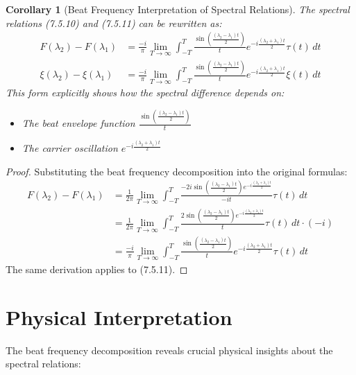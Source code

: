 \documentclass[12pt]{article}
\newtheorem{corollary}{Corollary}
\begin{document}
\begin{corollary}[Beat Frequency Interpretation of Spectral Relations]
The spectral relations (7.5.10) and (7.5.11) can be rewritten as:
\begin{align}
F(\lambda_2) - F(\lambda_1) &= \frac{-i}{\pi} \lim_{T \to \infty} \int_{-T}^{T} \frac{\sin\left(\frac{(\lambda_2 - \lambda_1)t}{2}\right)}{t} e^{-i\frac{(\lambda_2 + \lambda_1)t}{2}} \tau(t) \, dt\\
\xi(\lambda_2) - \xi(\lambda_1) &= \frac{-i}{\pi} \lim_{T \to \infty} \int_{-T}^{T} \frac{\sin\left(\frac{(\lambda_2 - \lambda_1)t}{2}\right)}{t} e^{-i\frac{(\lambda_2 + \lambda_1)t}{2}} \xi(t) \, dt
\end{align}
This form explicitly shows how the spectral difference depends on:
\begin{itemize}
\item The beat envelope function $\frac{\sin\left(\frac{(\lambda_2 - \lambda_1)t}{2}\right)}{t}$
\item The carrier oscillation $e^{-i\frac{(\lambda_2 + \lambda_1)t}{2}}$
\end{itemize}
\end{corollary}

\begin{proof}
Substituting the beat frequency decomposition into the original formulas:
\begin{align}
F(\lambda_2) - F(\lambda_1) &= \frac{1}{2\pi} \lim_{T \to \infty} \int_{-T}^{T} \frac{-2i \sin\left(\frac{(\lambda_2 - \lambda_1)t}{2}\right) e^{-i\frac{(\lambda_2 + \lambda_1)t}{2}}}{-it} \tau(t) \, dt\\
&= \frac{1}{2\pi} \lim_{T \to \infty} \int_{-T}^{T} \frac{2 \sin\left(\frac{(\lambda_2 - \lambda_1)t}{2}\right) e^{-i\frac{(\lambda_2 + \lambda_1)t}{2}}}{t} \tau(t) \, dt \cdot (-i)\\
&= \frac{-i}{\pi} \lim_{T \to \infty} \int_{-T}^{T} \frac{\sin\left(\frac{(\lambda_2 - \lambda_1)t}{2}\right)}{t} e^{-i\frac{(\lambda_2 + \lambda_1)t}{2}} \tau(t) \, dt
\end{align}
The same derivation applies to (7.5.11).
\end{proof}

\section{Physical Interpretation}

The beat frequency decomposition reveals crucial physical insights about the spectral relations:
\end{document}
